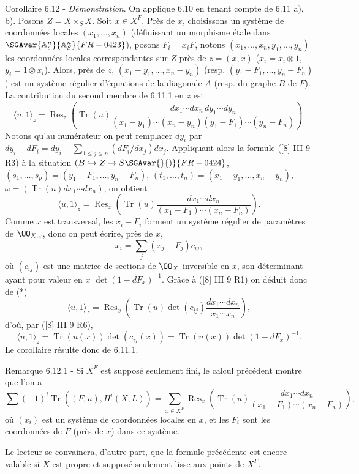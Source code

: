 \begin{statement}{Corollaire 6.12 -}
\emph{Démonstration}. On applique 6.10 en tenant compte de 6.11 a), b). Posons $Z=X\times_S X$. Soit $x\in X^F$. Près de $x$, choisissons un système de coordonnées locales $(x_1,\ldots,x_n)$ (définissant un morphisme étale dans $\SGAvar{\mathbb{A}_s^n}{\mathbb{A}_S^n}{FR-0423}$), posons $F_i=x_iF$, notons $(x_1,\ldots,x_n,y_1,\ldots,y_n)$ les coordonnées locales correspondantes sur $Z$ près de $z=(x,x)$ ($x_i=x_i\otimes1$, $y_i=1\otimes x_i$). Alors, près de $z$, $(x_1-y_1,\ldots,x_n-y_n)$ (resp. $(y_1-F_1,\ldots,y_n-F_n)$) est un système régulier d'équations de la diagonale $A$ (resp. du graphe $B$ de $F$). La contribution du second membre de 6.11.1 en $z$ est
\[
\langle u,1\rangle_z=
\operatorname{Res}_z\left(\operatorname{Tr}(u)\frac{dx_1\cdots dx_n\,dy_1\cdots dy_n}{(x_1-y_1)\cdots(x_n-y_n)(y_1-F_1)\cdots(y_n-F_n)}\right).
\]
Notons qu'au numérateur on peut remplacer $dy_i$ par $dy_i-dF_i=dy_i-\sum_{1\le j\le n}(dF_i/dx_j)dx_j$. Appliquant alors la formule ([8] III 9 R3) à la situation $(B\hookrightarrow Z\to S\SGAvar{}{)}{FR-0424}$, $(s_1,\ldots,s_p)=(y_1-F_1,\ldots,y_n-F_n)$, $(t_1,\ldots,t_n)=(x_1-y_1,\ldots,x_n-y_n)$, $\omega=(\operatorname{Tr}(u)dx_1\cdots dx_n)$, on obtient
\begin{equation}
\tag{*}
\langle u,1\rangle_z=
\operatorname{Res}_x\left(\operatorname{Tr}(u)\frac{dx_1\cdots dx_n}{(x_1-F_1)\cdots(x_n-F_n)}\right).
\end{equation}
Comme $x$ est transversal, les $x_i-F_i$ forment un système régulier de paramètres de $\OO_{X,x}$, donc on peut écrire, près de $x$,
\[
x_i=\sum_j(x_j-F_j)c_{ij},
\]
où $(c_{ij})$ est une matrice de sections de $\OO_X$ inversible en $x$, son déterminant ayant pour valeur en $x$ $\det(1-dF_x)^{-1}$. Grâce à ([8] III 9 R1) on déduit donc de (*)
\[
\langle u,1\rangle_z=\operatorname{Res}_x\left(\operatorname{Tr}(u)\det(c_{ij})\frac{dx_1\cdots dx_n}{x_1\cdots x_n}\right),
\]
d'où, par ([8] III 9 R6),
\[
\langle u,1\rangle_z=\operatorname{Tr}(u(x))\det(c_{ij}(x))=\operatorname{Tr}(u(x))\det(1-dF_x)^{-1}.
\]
Le
corollaire résulte donc de 6.11.1.
\end{statement}

\begin{statement}{Remarque 6.12.1 -}
Si $X^F$ est supposé seulement fini, le calcul précédent montre que l'on a
\[
\sum(-1)^i\operatorname{Tr}((F,u),H^i(X,L))=
\sum_{x\in X^F}\operatorname{Res}_x\left(\operatorname{Tr}(u)\frac{dx_1\cdots dx_n}{(x_1-F_1)\cdots(x_n-F_n)}\right),
\]
où $(x_i)$ est un système de coordonnées locales en $x$, et les $F_i$ sont les coordonnées de $F$ (près de $x$) dans ce système.

Le lecteur se convaincra, d'autre part, que la formule précédente est encore valable si $X$ est propre et supposé seulement lisse aux points de $X^F$.
\end{statement}


